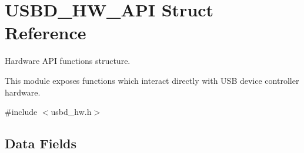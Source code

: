 \hypertarget{structUSBD__HW__API}{\section{U\-S\-B\-D\-\_\-\-H\-W\-\_\-\-A\-P\-I Struct Reference}
\label{structUSBD__HW__API}
}


Hardware A\-P\-I functions structure.

This module exposes functions which interact directly with U\-S\-B device controller hardware.  




{\ttfamily \#include $<$usbd\-\_\-hw.\-h$>$}

\subsection*{Data Fields}
